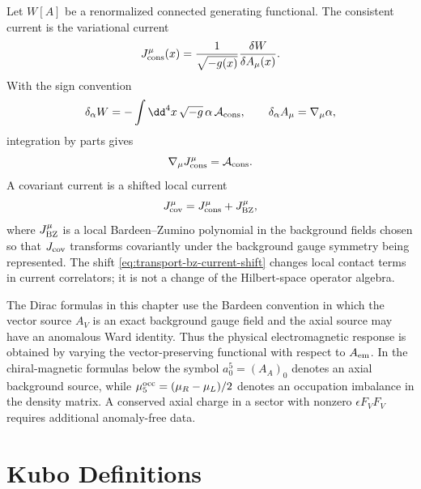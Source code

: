 \begin{definition}
\label{def:consistent-covariant-currents-transport}
Let \(W[A]\) be a renormalized connected generating functional.  The
consistent current is the variational current
\[
  J_{\rm cons}^\mu(x)
  =
  \frac{1}{\sqrt{-g(x)}}\frac{\delta W}{\delta A_\mu(x)}.
\]
With the sign convention
\begin{equation}
  \delta_\alpha W
  =
  -\int\dd^4x\,\sqrt{-g}\,\alpha\,\mathcal A_{\rm cons},
  \qquad
  \delta_\alpha A_\mu=\nabla_\mu\alpha ,
  \label{eq:transport-consistent-anomaly-sign}
\end{equation}
integration by parts gives
\[
  \nabla_\mu J_{\rm cons}^\mu=\mathcal A_{\rm cons}.
\]
A covariant current is a shifted local current
\begin{equation}
  J_{\rm cov}^\mu
  =
  J_{\rm cons}^\mu+J_{\rm BZ}^\mu,
  \label{eq:transport-bz-current-shift}
\end{equation}
where \(J_{\rm BZ}^\mu\) is a local Bardeen--Zumino polynomial in the
background fields chosen so that \(J_{\rm cov}\) transforms covariantly under
the background gauge symmetry being represented.  The shift
\eqref{eq:transport-bz-current-shift} changes local contact terms in current
correlators; it is not a change of the Hilbert-space operator algebra.
\end{definition}

\begin{remark}
\label{rem:transport-vector-preserving-bardeen}
The Dirac formulas in this chapter use the Bardeen convention in which the
vector source \(A_V\) is an exact background gauge field and the axial source
may have an anomalous Ward identity.  Thus the physical electromagnetic
response is obtained by varying the vector-preserving functional with respect
to \(A_{\rm em}\).  In the chiral-magnetic formulas below the symbol
\(a_0^5=(A_A)_0\) denotes an axial background source, while
\(\mu_5^{\rm occ}=(\mu_R-\mu_L)/2\) denotes an occupation imbalance in the
density matrix.  A conserved axial charge in a sector with nonzero
\(\epsilon F_VF_V\) requires additional anomaly-free data.
\end{remark}

\section{Kubo Definitions}

